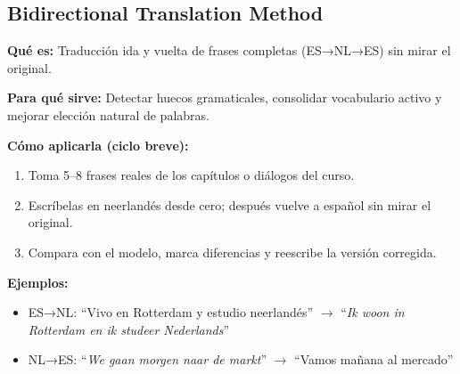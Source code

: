 \subsection*{Bidirectional Translation Method}
\textbf{Qué es:} Traducción ida y vuelta de frases completas (ES→NL→ES) sin mirar el original.

\textbf{Para qué sirve:} Detectar huecos gramaticales, consolidar vocabulario activo y mejorar elección natural de palabras.

\textbf{Cómo aplicarla (ciclo breve):}
\begin{enumerate}[leftmargin=*]
	\item Toma 5--8 frases reales de los capítulos o diálogos del curso.
	\item Escríbelas en neerlandés desde cero; después vuelve a español sin mirar el original.
	\item Compara con el modelo, marca diferencias y reescribe la versión corregida.
\end{enumerate}

\textbf{Ejemplos:}
\begin{itemize}[leftmargin=*]
	\item ES→NL: \enquote{Vivo en Rotterdam y estudio neerlandés} $\rightarrow$ \enquote{\textit{Ik woon in Rotterdam en ik studeer Nederlands}}
	\item NL→ES: \enquote{\textit{We gaan morgen naar de markt}} $\rightarrow$ \enquote{Vamos mañana al mercado}
\end{itemize}
